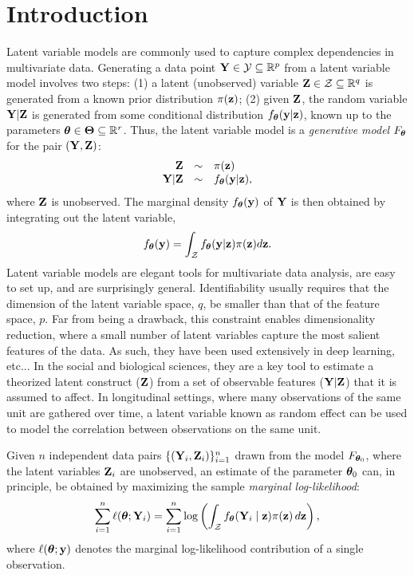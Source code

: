 \documentclass[twoside,11pt]{article}
\begin{document}
\section{Introduction}
 Latent variable models are commonly used to capture complex dependencies in multivariate data. Generating a data point ${\bf Y}\in \mathcal Y \subseteq \mathbb R^p$ from a latent variable model  involves two steps: (1) a latent (unobserved) variable ${\bf Z}\in \mathcal Z \subseteq\mathbb R^q$ is generated from a known prior distribution $\pi({\bf z})$; (2) given ${\bf Z}$, the random variable ${\bf Y}|{\bf Z}$ is generated from some conditional distribution $f_{\bm{\theta}}({\bf y}|{\bf z})$, known up to the parameters ${\bm{\theta}}\in\bm\Theta\subseteq \mathbb R^r$. Thus, the latent variable model is a \textit{generative model} $F_{\bm{\theta}}$ for the pair $({\bf Y}, {\bf Z})$:
%
\begin{align}
    \begin{matrix}
        \hfill\Z &\sim& \pi(\z)\hfill\\
        \hfill\Y|\Z &\sim& f_\bt(\y|\z)\hfill,
    \end{matrix}
    \label{eqn:generative-model-general}
\end{align}
%
where ${\bf Z}$ is unobserved.
% 
The marginal density $f_{\bm{\theta}}({\bf y})$ of ${\bf Y}$ is then obtained by integrating out the latent variable, 
%
\begin{equation}
    f_{\bm{\theta}}({\bf y}) = \int_{\mathcal Z} f_{\bm{\theta}}({\bf y}|{\bf z})\pi({\bf z})d{\bf z}.
\end{equation}
%
Latent variable models are elegant tools for multivariate data analysis, are easy to set up, and are surprisingly general. Identifiability usually requires that the dimension of the latent variable space, $q$, be smaller than that of the feature space, $p$. Far from being a drawback, this constraint enables dimensionality reduction, where a small number of latent variables capture the most salient features of the data. As such, they have been used extensively in deep learning, etc... In the social and biological sciences, they are a key tool to estimate a theorized latent construct (${\bf Z}$) from a set of observable features (${\bf Y}|{\bf Z}$) that it is assumed to affect. In longitudinal settings, where many observations of the same unit are gathered over time, a latent variable known as random effect can be used to model the correlation between observations on the same unit.




Given $n$ independent data pairs $\{({\bf Y}_i, {\bf Z}_i)\}_{i=1}^n$ drawn from the model $F_{{\bm{\theta}}_0}$, where the latent variables ${\bf Z}_i$ are unobserved, an estimate of the parameter ${\bm{\theta}}_0$ can, in principle, be obtained by maximizing the sample \textit{marginal log-likelihood}:
\begin{equation}
\sum_{i=1}^n \ell({\bm{\theta}}; {\bf Y}_i) = \sum_{i=1}^n \log\left( \int_{\mathcal Z} f_{\bm{\theta}}({\bf Y}_i \mid {\bf z})\pi({\bf z})\,d{\bf z} \right),
\label{eqn:marginal-likelihood}
\end{equation}
where $\ell({\bm{\theta}}; {\bf y})$ denotes the marginal log-likelihood contribution of a single observation.
\end{document}
